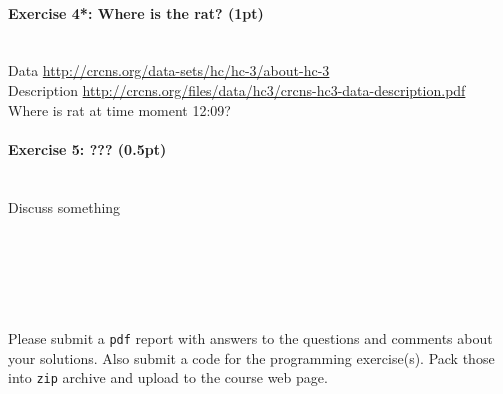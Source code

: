\documentclass[a4paper,11pt]{article}
\newenvironment{exercise}[3]{\paragraph{Exercise #1: #2 (#3pt)}\ \\}{
\medskip}
\begin{document}
\begin{exercise}{4*}{Where is the rat?}{1}
Data \url{http://crcns.org/data-sets/hc/hc-3/about-hc-3}\\
Description \url{http://crcns.org/files/data/hc3/crcns-hc3-data-description.pdf}\\
Where is rat at time moment 12:09?
\end{exercise}

\begin{exercise}{5}{???}{0.5}
Discuss something
\end{exercise}



\ \\
\ \\
\ \\
\ \\
\ \\
Please submit a \texttt{pdf} report with answers to the questions and comments about your solutions. Also submit a code for the programming exercise(s). Pack those into \texttt{zip} archive and upload to the course web page.
\end{document}
